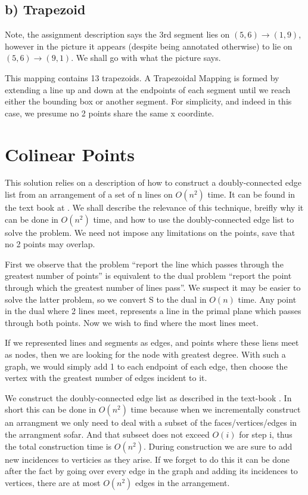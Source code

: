 \documentclass{article}
\begin{document}
\subsection{b) Trapezoid}
Note, the assignment description says the 3rd segment lies on $(5,6) \rightarrow (1,9)$, however in the picture it appears (despite being annotated otherwise) to lie on $(5,6) \rightarrow (9,1)$.
We shall go with what the picture says.

This mapping contains 13 trapezoids.
A Trapezoidal Mapping is formed by extending a line up and down at the endpoints of each segment until we reach either the bounding box or another segment.
For simplicity, and indeed in this case, we presume no 2 points share the same x coordinte.

\section {Colinear Points}

This solution relies on a description of how to construct a doubly-connected edge list from an arrangement of a set of n lines on $O(n^2)$ time.
It can be found in the text book at \cite{tb}.
We shall describe the relevance of this technique, breifly why it can be done in $O(n^2)$ time, and how to use the doubly-connected edge list to solve the problem.
We need not impose any limitations on the points, save that no 2 points may overlap.

First we observe that the problem ``report the line which passes through the greatest number of points'' is equivalent to the dual problem ``report the point through which the greatest number of lines pass''.
We suspect it may be easier to solve the latter problem, so we convert S to the dual in $O(n)$ time.
Any point in the dual where 2 lines meet, represents a line in the primal plane which passes through both points.
Now we wish to find where the most lines meet.

If we represented lines and segments as edges, and points where these liens meet as nodes, then we are looking for the node with greatest degree.
With such a graph, we would simply add 1 to each endpoint of each edge, then choose the vertex with the greatest number of edges incident to it.

We construct the doubly-connected edge list as described in the text-book \cite{tb}.
In short this can be done in $O(n^2)$ time because when we incrementally construct an arrangment we only need to deal with a subset of the faces/vertices/edges in the arrangment sofar.
And that subseet does not exceed $O(i)$ for step i, thus the total construction time is $O(n^2)$.
During construction we are sure to add new incidences to verticies as they arise.
If we forget to do this it can be done after the fact by going over every edge in the graph and adding its incidences to vertices, there are at most $O(n^2)$ edges in the arrangement.
\end{document}
